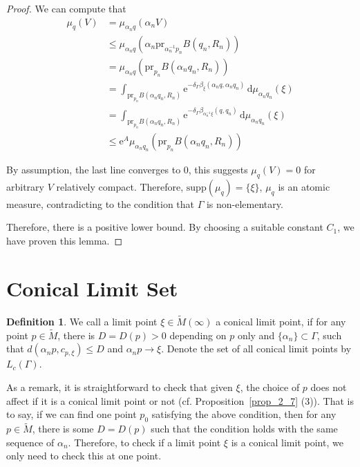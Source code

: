 \documentclass[reqno,11pt]{article}
\theoremstyle{definition}
\newtheorem{definition}[theorem]{Definition}
\theoremstyle{remark}
\numberwithin{equation}{section}
\begin{document}
\begin{proof}
	We can compute that
	\begin{equation}
		\begin{aligned}
			\mu_q(V) & =\mu_{\alpha_n q}(\alpha_n V)                                                                                                                  \\
			         & \leq \mu_{\alpha_n q}(\alpha_n \text{pr}_{\alpha_n^{-1}p_n} B(q_n,R_n))                                                                        \\
			         & =\mu_{\alpha_n q}(\text{pr}_{p_n} B(\alpha_n q_n, R_n))                                                                                        \\
			         & =\int_{\text{pr}_{p_n}B(\alpha_n q_n, R_n)}\mathrm{e}^{-\delta_\Gamma\beta_{\xi}(\alpha_n q, \alpha_n q_n)}\,\mathrm{d}\mu_{\alpha_n q_n}(\xi) \\
			         & =\int_{\text{pr}_{p_n}B(\alpha_n q_n, R_n)}\mathrm{e}^{-\delta_\Gamma\beta_{\alpha_n^{-1}\xi}(q, q_n)}\,\mathrm{d}\mu_{\alpha_n q_n}(\xi)      \\
			         & \leq\mathrm{e}^{A}\mu_{\alpha_n q_n}(\text{pr}_{p_n}B(\alpha_n q_n, R_n))
		\end{aligned}
	\end{equation}

	By assumption, the last line converges to $0$, this suggests $\mu_q(V)=0$ for arbitrary $V$ relatively compact. Therefore, $\text{supp}(\mu_q)=\{\xi\}$, $\mu_q$ is an atomic measure, contradicting to the condition that $\Gamma$ is non-elementary.

	Therefore, there is a positive lower bound. By choosing a suitable constant $C_1$, we have proven this lemma.
\end{proof}


\section{\bf Conical Limit Set}\label{sec5}
\begin{definition}
	We call a limit point $\xi\in\widetilde{M}(\infty)$ a conical limit point, if for any point $p\in\widetilde{M}$, there is $D=D(p)>0$ depending on $p$ only and $\{\alpha_n\}\subset\Gamma$, such that $d(\alpha_n p, c_{p,\xi})\leq D$ and $\alpha_n p\to\xi$. Denote the set of all conical limit points by $L_c(\Gamma)$. 
\end{definition}

As a remark, it is straightforward to check that given $\xi$, the choice of $p$ does not affect if it is a conical limit point or not (cf. Proposition~\ref{prop_2_7} (3)). That is to say, if we can find one point $p_0$ satisfying the above condition, then for any $p\in\widetilde{M}$, there is some $D=D(p)$ such that the condition holds with the same sequence of $\alpha_n$. Therefore, to check if a limit point $\xi$ is a conical limit point, we only need to check this at one point.
\end{document}

